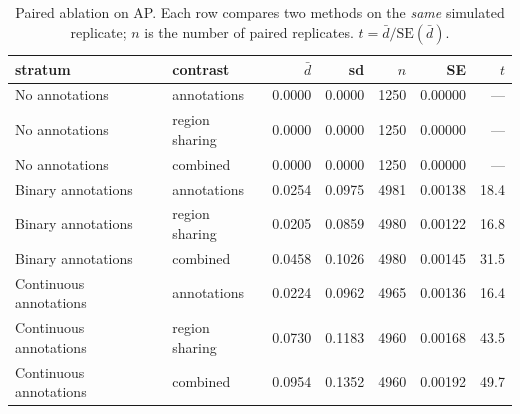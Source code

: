 \begin{table}[htbp]\centering\small
\caption{Paired ablation on AP. Each row compares two methods on the \emph{same} simulated replicate; $n$ is the number of paired replicates. $t=\bar d/\mathrm{SE}(\bar d)$.}\label{tab:ablation}
\begin{tabular}{llrrrrr}\toprule
stratum & contrast & $\bar d$ & sd & $n$ & SE & $t$\\\midrule
No annotations & annotations & 0.0000 & 0.0000 & 1250 & 0.00000 & ---\\
No annotations & region sharing & 0.0000 & 0.0000 & 1250 & 0.00000 & ---\\
No annotations & combined & 0.0000 & 0.0000 & 1250 & 0.00000 & ---\\
Binary annotations & annotations & 0.0254 & 0.0975 & 4981 & 0.00138 & 18.4\\
Binary annotations & region sharing & 0.0205 & 0.0859 & 4980 & 0.00122 & 16.8\\
Binary annotations & combined & 0.0458 & 0.1026 & 4980 & 0.00145 & 31.5\\
Continuous annotations & annotations & 0.0224 & 0.0962 & 4965 & 0.00136 & 16.4\\
Continuous annotations & region sharing & 0.0730 & 0.1183 & 4960 & 0.00168 & 43.5\\
Continuous annotations & combined & 0.0954 & 0.1352 & 4960 & 0.00192 & 49.7\\
\bottomrule\end{tabular}\end{table}
